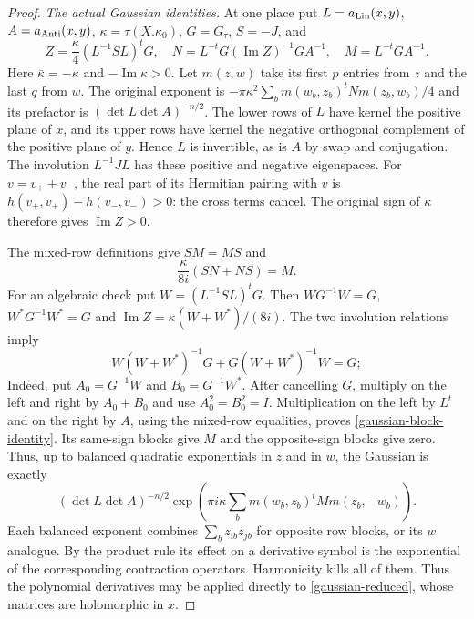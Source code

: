 \begin{proof}
\emph{The actual Gaussian identities.}
At one place put $L=a_{\rm Lin}(x,y)$, $A=a_{\rm Anti}(x,y)$,
$\kappa=\tau(X.\kappa_0)$, $G=G_\tau$, $S=-J$, and
\[
 Z=\frac{\kappa}{4}(L^{-1}SL)^tG,\quad
 N=L^{-t}G(\operatorname{Im}Z)^{-1}GA^{-1},\quad M=L^{-t}GA^{-1}.
\]
Here $\bar\kappa=-\kappa$ and $-\operatorname{Im}\kappa>0$.
Let $m(z,w)$ take its first $p$ entries from $z$ and the last
$q$ from $w$. The original exponent is
$-\pi\kappa^2\sum_bm(w_b,z_b)^tNm(z_b,w_b)/4$ and its
prefactor is $(\det L\det A)^{-n/2}$.
The lower rows of $L$ have kernel the positive plane of $x$,
and its upper rows have kernel the negative orthogonal
complement of the positive plane of $y$. Hence $L$ is invertible,
as is $A$ by swap and conjugation.
The involution $L^{-1}JL$ has these positive and negative
eigenspaces. For $v=v_++v_-$, the real part of its Hermitian
pairing with $v$ is $h(v_+,v_+)-h(v_-,v_-)>0$:
the cross terms cancel. The original sign of $\kappa$
therefore gives $\operatorname{Im}Z>0$.

The mixed-row definitions give $SM=MS$ and
\begin{equation}\label{gaussian-block-identity}
                  \frac{\kappa}{8i}(SN+NS)=M.
\end{equation}
For an algebraic check put $W=(L^{-1}SL)^tG$.
Then $WG^{-1}W=G$, $W^*G^{-1}W^*=G$ and
$\operatorname{Im}Z=\kappa(W+W^*)/(8i)$.
The two involution relations imply
\[
 W(W+W^*)^{-1}G+G(W+W^*)^{-1}W=G;
\]
Indeed, put $A_0=G^{-1}W$ and $B_0=G^{-1}W^*$.
After cancelling $G$, multiply on the left and right by
$A_0+B_0$ and use $A_0^2=B_0^2=I$.
Multiplication on the left by $L^t$ and on the right by $A$,
using the mixed-row equalities, proves
\eqref{gaussian-block-identity}.
Its same-sign blocks give $M$ and the opposite-sign blocks
give zero. Thus, up to balanced quadratic exponentials
in $z$ and in $w$, the Gaussian is exactly
\begin{equation}\label{gaussian-reduced}
 (\det L\det A)^{-n/2}
 \exp\!\left(\pi i\kappa\sum_b
                   m(w_b,z_b)^tM m(z_b,-w_b)\right).
\end{equation}
Each balanced exponent combines $\sum_bz_{ib}z_{jb}$ for
opposite row blocks, or its $w$ analogue. By the product
rule its effect on a derivative symbol is the exponential
of the corresponding contraction operators. Harmonicity
kills all of them. Thus the polynomial derivatives may
be applied directly to \eqref{gaussian-reduced}, whose
matrices are holomorphic in $x$.


\end{proof}

